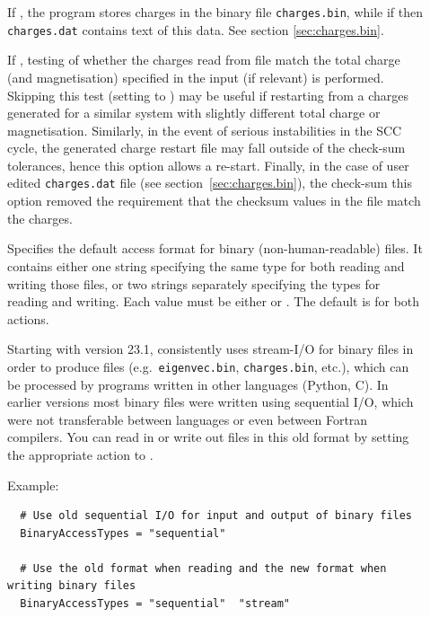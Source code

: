 \begin{description}
\item[] If , the program stores charges in the
  binary file \verb|charges.bin|, while if  then \verb|charges.dat|
  contains text of this data. See section \ref{sec:charges.bin}.

\item[] If , testing of whether the charges read from
  file match the total charge (and magnetisation) specified in the {\dftbp}
  input (if relevant) is performed. Skipping this test (setting to ) may
  be useful if restarting from a charges generated for a similar system with
  slightly different total charge or magnetisation. Similarly, in the event of
  serious instabilities in the SCC cycle, the generated charge restart file may
  fall outside of the check-sum tolerances, hence this option allows a
  re-start. Finally, in the case of user edited \verb|charges.dat| file (see
  section~\ref{sec:charges.bin}), the check-sum this option removed the
  requirement that the checksum values in the file match the charges.

\item[\label{sec:dftbp.Options.BinaryAccessTypes}]
  Specifies the default access format for binary (non-human-readable) files. It
  contains either one string specifying the same type for both reading and
  writing those files, or two strings separately specifying the types for
  reading and writing. Each value must be either  or
  . The default is  for both actions.

  Starting with version 23.1, \dftbp{} consistently uses stream-I/O for binary
  files in order to produce files (e.g.\ \verb|eigenvec.bin|,
  \verb|charges.bin|, etc.), which can be processed by programs written in other
  languages (Python, C). In earlier versions most binary files were written
  using sequential I/O, which were not transferable between languages or even
  between Fortran compilers. You can read in or write out files in this old
  format by setting the appropriate action to .

  Example:
\begin{verbatim}
  # Use old sequential I/O for input and output of binary files
  BinaryAccessTypes = "sequential"

  # Use the old format when reading and the new format when writing binary files
  BinaryAccessTypes = "sequential"  "stream"
\end{verbatim}

\end{description}

